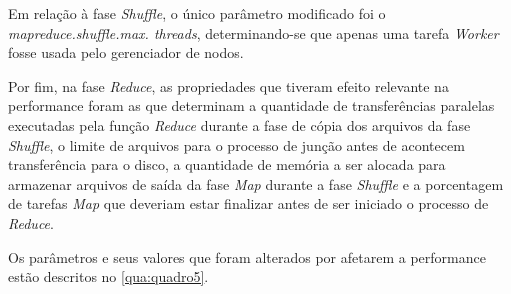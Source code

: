 Em relação à fase \textit{Shuffle}, o único parâmetro modificado foi o \textit{mapreduce.shuffle.max. threads}, determinando-se que apenas uma tarefa \textit{Worker} fosse usada pelo gerenciador de nodos.

Por fim, na fase \textit{Reduce}, as propriedades que tiveram efeito relevante na performance foram as que determinam a quantidade de transferências paralelas executadas pela função \textit{Reduce} durante a fase de cópia dos arquivos da fase \textit{Shuffle}, o limite de arquivos para o processo de junção antes de acontecem transferência para o disco, a quantidade de memória a ser alocada para armazenar arquivos de saída da fase \textit{Map} durante a fase \textit{Shuffle} e a porcentagem de tarefas \textit{Map} que deveriam estar finalizar antes de ser iniciado o processo de \textit{Reduce}.

Os parâmetros e seus valores que foram alterados por afetarem a performance estão descritos no \autoref{qua:quadro5}.

